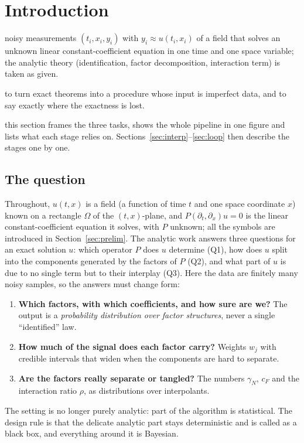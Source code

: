 \documentclass[11pt,a4paper]{article}
\theoremstyle{definition}
\newcommand{\sectionbrief}[3]{\begin{leadin}\begin{description}[nosep,leftmargin=3.0cm,labelwidth=2.8cm]
  \item[Starting from] #1
  \item[Why this section] #2
  \item[Role in the paper] #3
  \end{description}\end{leadin}}
\begin{document}
\section{Introduction}\label{sec:intro}
\sectionbrief
{noisy measurements $(t_i,x_i,y_i)$ with $y_i\approx u(t_i,x_i)$ of a field that solves an unknown linear constant-coefficient equation in one time and one space variable; the analytic theory (identification, factor decomposition, interaction term) is taken as given.}
{to turn exact theorems into a procedure whose input is imperfect data, and to say exactly where the exactness is lost.}
{this section frames the three tasks, shows the whole pipeline in one figure and lists what each stage relies on. Sections~\ref{sec:interp}--\ref{sec:loop} then describe the stages one by one.}

\subsection{The question}
Throughout, $u(t,x)$ is a field (a function of time $t$ and one space coordinate $x$) known on a rectangle $\Omega$ of the $(t,x)$-plane, and $P(\partial_t,\partial_x)u=0$ is the linear constant-coefficient equation it solves, with $P$ unknown; all the symbols are introduced in Section~\ref{sec:prelim}. The analytic work answers three questions for an exact solution $u$: which operator $P$ does $u$ determine (Q1), how does $u$ split into the components generated by the factors of $P$ (Q2), and what part of $u$ is due to no single term but to their interplay (Q3). Here the data are finitely many noisy samples, so the answers must change form:
\begin{enumerate}[label=\textbf{A\arabic*.},leftmargin=1.1cm,nosep]
\item \textbf{Which factors, with which coefficients, and how sure are we?} The output is a \emph{probability distribution over factor structures}, never a single ``identified'' law.
\item \textbf{How much of the signal does each factor carry?} Weights $w_j$ with credible intervals that widen when the components are hard to separate.
\item \textbf{Are the factors really separate or tangled?} The numbers $\gamma_N$, $c_F$ and the interaction ratio $\rho$, as distributions over interpolants.
\end{enumerate}
The setting is no longer purely analytic: part of the algorithm is statistical. The design rule is that the delicate analytic part stays deterministic and is called as a black box, and everything around it is Bayesian.
\end{document}
